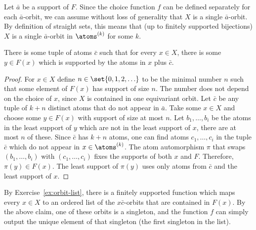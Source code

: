{ 
 Let $\bar a$ be a support of $F$.
 Since the choice function $f$ can be defined separately for each $\bar a$-orbit, we can assume without loss of generality that $X$ is a single $\bar a$-orbit. By definition of straight sets, this means that (up to finitely supported bijections) $X$ is a single $\bar a$-orbit in $\atoms^{(k)}$ for some $k$. 

 \begin{claim}
 There is some tuple of atoms $\bar c$ such that for every $x \in X$, there is some $y \in F(x)$ which is supported by the atoms in $x$ plus $\bar c$.
 \end{claim}
 \begin{proof} For $x \in X$ define $n \in \set{0,1,2,\ldots}$ to be the minimal number $n$ such that some element of $F(x)$ has support of size $n$. 
 The number does not depend on the choice of $x$, since $X$ is contained in one equivariant orbit. Let $\bar c$ be any tuple of $k+n$ distinct atoms that do not appear in $\bar a$. Take some $x \in X$ and choose some $y \in F(x)$ with support of size at most $n$. Let $b_1,\ldots,b_i$ be the atoms in the least support of $y$ which are not in the least support of $x$, there are at most $n$ of these. Since $\bar c$ has $k+n$ atoms, one can find atoms $c_1,\ldots,c_i$ in the tuple $\bar c$ which do not appear in $x \in \atoms^{(k)}$. The atom automorphism $\pi$ that swaps $(b_1,\ldots,b_i)$ with $(c_1,\ldots,c_i)$ fixes the supports of both $x$ and $F$. Therefore, $\pi(y) \in F(x)$. The least support of $\pi(y)$ uses only atoms from $\bar c$ and the least support of $x$. 
 \end{proof}

 By Exercise~\ref{ex:orbit-list}, there is a finitely supported function which maps every $x \in X$ to an ordered list of the $x \bar c$-orbits that are contained in $F(x)$. By the above claim, one of these orbits is a singleton, and the function $f$ can simply output the unique element of that singleton (the first singleton in the list).
}


